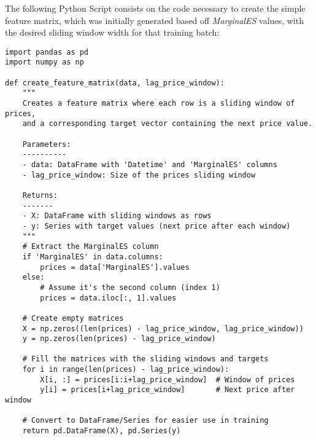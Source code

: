 \documentclass[12pt]{report} %
\begin{document}
    
    
    



The following Python Script consists on the code necessary to create the simple feature matrix, which was initially generated based off \textit{MarginalES} values, with the desired sliding window width for that training batch:
\begin{lstlisting}
import pandas as pd
import numpy as np

def create_feature_matrix(data, lag_price_window):
    """
    Creates a feature matrix where each row is a sliding window of prices,
    and a corresponding target vector containing the next price value.
    
    Parameters:
    ----------
    - data: DataFrame with 'Datetime' and 'MarginalES' columns
    - lag_price_window: Size of the prices sliding window
    
    Returns:
    -------
    - X: DataFrame with sliding windows as rows
    - y: Series with target values (next price after each window)
    """
    # Extract the MarginalES column
    if 'MarginalES' in data.columns:
        prices = data['MarginalES'].values
    else:
        # Assume it's the second column (index 1)
        prices = data.iloc[:, 1].values
    
    # Create empty matrices
    X = np.zeros((len(prices) - lag_price_window, lag_price_window))
    y = np.zeros(len(prices) - lag_price_window)
    
    # Fill the matrices with the sliding windows and targets
    for i in range(len(prices) - lag_price_window):
        X[i, :] = prices[i:i+lag_price_window]  # Window of prices
        y[i] = prices[i+lag_price_window]       # Next price after window
    
    # Convert to DataFrame/Series for easier use in training
    return pd.DataFrame(X), pd.Series(y)
\end{lstlisting}
\end{document}

